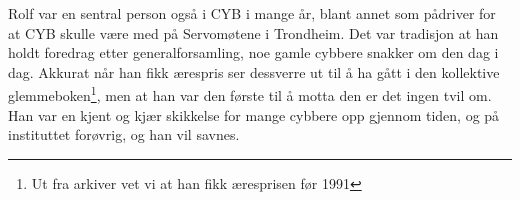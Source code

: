 Rolf var en sentral person også i CYB i mange år, blant annet som pådriver for at CYB skulle være med på Servomøtene i Trondheim. Det var tradisjon at han holdt foredrag etter generalforsamling, noe gamle cybbere snakker om den dag i dag. Akkurat når han fikk ærespris ser dessverre ut til å ha gått i den kollektive glemmeboken\footnote{Ut fra arkiver vet vi at han fikk æresprisen før 1991}, men at han var den første til å motta den er det ingen tvil om. Han var en kjent og kjær skikkelse for mange cybbere opp gjennom tiden, og på instituttet forøvrig, og han vil savnes.
